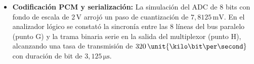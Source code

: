 \begin{itemize}
    \item \textbf{Codificación PCM y serialización:} La simulación del ADC de 8 bits con fondo de escala de $2\,\unit{\volt}$
          arrojó un paso de cuantización de $7{,}8125\,\unit{\milli\volt}$. En el analizador lógico se constató la
          sincronía entre las 8 líneas del bus paralelo (punto G) y la trama binaria serie en la salida del multiplexor
          (punto H), alcanzando una tasa de transmisión de $320\,\unit{\kilo\bit\per\second}$ con duración de bit de
          $3{,}125\,\unit{\micro\second}$.
\end{itemize}
